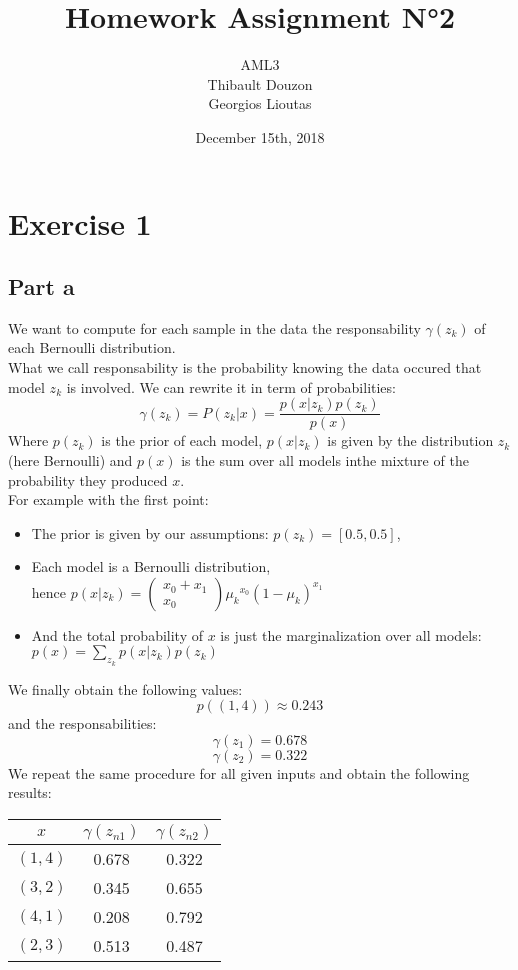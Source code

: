 \documentclass[a4paper, 10pt]{article}
\title{Homework Assignment N°2}
\author{AML3\\Thibault Douzon\\Georgios Lioutas}
\date{December 15th, 2018}
\begin{document}
\maketitle

\pagebreak

\tableofcontents

\pagebreak
\section{Exercise 1}
\subsection{Part a}
We want to compute for each sample in the data the responsability 
$\gamma(z_k)$ of each Bernoulli distribution.
\\
What we call responsability is the probability knowing the data occured that model $z_k$ is involved.
We can rewrite it in term of probabilities:
$$
\gamma(z_k) = P(z_k \vert x) = \frac{p(x \vert z_k) p(z_k)}{p(x)}
$$
Where $p(z_k)$ is the prior of each model, $p(x\vert z_k)$ is given by the distribution $z_k$ (here Bernoulli)
and $p(x)$ is the sum over all models inthe mixture of the probability they produced $x$.
\\
For example with the first point:
\\
\begin{itemize}
    \item The prior is given by our assumptions: $p(z_k) = \left[0.5, 0.5 \right]$,
    
    \item Each model is a Bernoulli distribution, \\hence $p(x\vert z_k) = 
    \left(
        \begin{array}{c}
            x_0+x_1 \\
            x_0
        \end{array}
    \right) {\mu_k}^{x_0}(1-\mu_k)^{x_1}$
    
    \item And the total probability of $x$ is just the marginalization over all models: $p(x) = \sum_{z_k} p(x \vert z_k) p(z_k)$
\end{itemize}
We finally obtain the following values:
$$
p((1,4)) \approx 0.243
$$
and the responsabilities:
$$
\gamma(z_1) = 0.678
$$
$$
\gamma(z_2) = 0.322
$$
We repeat the same procedure for all given inputs and obtain the following results:
\begin{center}
    \begin{tabular}{ |c|c|c| }
        \hline
        $x$ & $\gamma(z_{n1})$ & $\gamma(z_{n2})$ \\
        \hline
        $(1, 4)$ & 0.678 & 0.322 \\
        \hline
        $(3, 2)$ & 0.345 & 0.655 \\
        \hline
        $(4, 1)$ & 0.208 & 0.792 \\
        \hline
        $(2, 3)$ & 0.513 & 0.487\\
        \hline
    \end{tabular}
\end{center}
\end{document}
